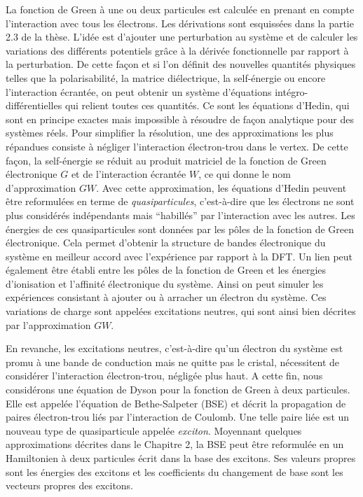 La fonction de Green à une ou deux particules est calculée en prenant en compte l'interaction avec tous les électrons. Les dérivations sont esquissées dans la partie 2.3 de la thèse. L'idée est d'ajouter une perturbation au système et de calculer les variations des différents potentiels grâce à la dérivée fonctionnelle par rapport à la perturbation. De cette façon et si l'on définit des nouvelles quantités physiques telles que la polarisabilité, la matrice diélectrique, la self-énergie ou encore l'interaction écrantée, on peut obtenir un système d'équations intégro-différentielles qui relient toutes ces quantités. Ce sont les équations d'Hedin, qui sont en principe exactes mais impossible à résoudre de façon analytique pour des systèmes réels. Pour simplifier la résolution, une des approximations les plus répandues consiste à négliger l'interaction électron-trou dans le vertex. De cette façon, la self-énergie se réduit au produit matriciel de la fonction de Green électronique $G$ et de l'interaction écrantée $W$, ce qui donne le nom d'approximation $GW$. Avec cette approximation, les équations d'Hedin peuvent être reformulées en terme de \textit{quasiparticules}, c'est-à-dire que les électrons ne sont plus considérés indépendants mais ``habillés'' par l'interaction avec les autres. Les énergies de ces quasiparticules sont données par les pôles de la fonction de Green électronique. Cela permet d'obtenir la structure de bandes électronique du système en meilleur accord avec l'expérience par rapport à la \acrshort{DFT}. Un lien peut également être établi entre les pôles de la fonction de Green et les énergies d'ionisation et l'affinité électronique du système. Ainsi on peut simuler les expériences consistant à ajouter ou à arracher un électron du système. Ces variations de charge sont appelées excitations neutres, qui sont ainsi bien décrites par l'approximation $GW$.

En revanche, les excitations neutres, c'est-à-dire qu'un électron du système est promu à une bande de conduction mais ne quitte pas le cristal, nécessitent de considérer l'interaction électron-trou, négligée plus haut. A cette fin, nous considérons une équation de Dyson pour la fonction de Green à deux particules. Elle est appelée l'équation de Bethe-Salpeter (BSE) et décrit la propagation de paires électron-trou liés par l'interaction de Coulomb. Une telle paire liée est un nouveau type de quasiparticule appelée \textit{exciton}. Moyennant quelques approximations décrites dans le Chapitre 2, la BSE peut être reformulée en un Hamiltonien à deux particules écrit dans la base des excitons. Ses valeurs propres sont les énergies des excitons et les coefficients du changement de base sont les vecteurs propres des excitons. 

